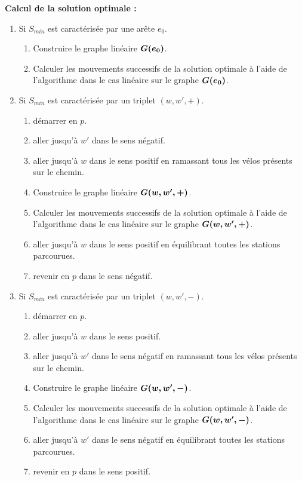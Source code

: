 \textbf{Calcul de la solution optimale :}
\begin{enumerate}
\item\label{Calcul mvt - Ze0 nul} Si $S_{min}$ est caractérisée par une arête $e_0$.
  \begin{enumerate}
  \item Construire le graphe linéaire $\boldsymbol{G(e_0)}$.
  \item Calculer les mouvements successifs de la solution optimale à l'aide de l'algorithme dans le cas linéaire sur le graphe $\boldsymbol{G(e_0)}$.
  \end{enumerate}
\item\label{Calcul mvt - Ze0 unitaire - direct} Si $S_{min}$ est caractérisée par un triplet $(w,w',+)$.
  \begin{enumerate}
  \item démarrer en $p$.
  \item aller jusqu'à $w'$ dans le sens négatif.
  \item aller jusqu'à $w$ dans le sens positif en ramassant tous les vélos présents sur le chemin.
  \item Construire le graphe linéaire $\boldsymbol{G(w,w',+)}$.
  \item Calculer les mouvements successifs de la solution optimale à l'aide de l'algorithme dans le cas linéaire sur le graphe $\boldsymbol{G(w,w',+)}$.
  \item aller jusqu'à $w$ dans le sens positif en équilibrant toutes les stations parcourues.
  \item revenir en $p$ dans le sens négatif.
  \end{enumerate}
\item\label{Calcul mvt - Ze0 unitaire - indirect} Si $S_{min}$ est caractérisée par un triplet $(w,w',-)$.
  \begin{enumerate}
  \item démarrer en $p$.
  \item aller jusqu'à $w$ dans le sens positif.
  \item aller jusqu'à $w'$ dans le sens négatif en ramassant tous les vélos présents sur le chemin.
  \item Construire le graphe linéaire $\boldsymbol{G(w,w',-)}$.
  \item Calculer les mouvements successifs de la solution optimale à l'aide de l'algorithme dans le cas linéaire sur le graphe $\boldsymbol{G(w,w',-)}$.
  \item aller jusqu'à $w'$ dans le sens négatif en équilibrant toutes les stations parcourues.
  \item revenir en $p$ dans le sens positif.
  \end{enumerate}
\end{enumerate}


